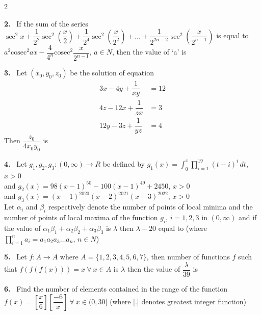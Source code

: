 \documentclass[10pt]{extarticle}
\newcommand{\qn}[1]{\par\smallskip\noindent\textbf{#1.}~}
\begin{document}
\begin{multicols}{2}
\qn{2} If the sum of the series $\sec^2x+\dfrac{1}{2^2}\sec^2\left(\dfrac x2\right)+\dfrac{1}{2^4}\sec^2\left(\dfrac{x}{2^2}\right)+\dots+\dfrac{1}{2^{2n-2}}\sec^2\left(\dfrac{x}{2^{n-1}}\right)$ is equal to $a^2\mathrm{cosec}^2ax-\dfrac{4}{4^n}\mathrm{cosec}^2\dfrac{x}{2^{n-1}}$, $a\in N$, then the value of `a' is

\qn{3} Let $(x_0,y_0,z_0)$ be the solution of equation
\begin{align*}
3x-4y+\dfrac{1}{xy}&=12\\
4z-12x+\dfrac{1}{zx}&=3\\
12y-3z+\dfrac{1}{yz}&=4
\end{align*}
Then $\dfrac{z_0}{4x_0y_0}$ is

\qn{4} Let $g_1,g_2,g_3:(0,\infty)\to R$ be defined by $g_1(x)=\displaystyle\int_0^x\prod_{i=1}^{19}(t-i)^i\,dt$, $x>0$\\
and $g_2(x)=98(x-1)^{50}-100(x-1)^{49}+2450$, $x>0$\\
and $g_3(x)=(x-1)^{2020}(x-2)^{2021}(x-3)^{2022}$, $x>0$\\
Let $\alpha_i$ and $\beta_i$ respectively denote the number of points of local minima and the number of points of local maxima of the function $g_i$, $i=1,2,3$ in $(0,\infty)$ and if the value of $\alpha_1\beta_1+\alpha_2\beta_2+\alpha_3\beta_3$ is $\lambda$ then $\lambda-20$ equal to (where $\displaystyle\prod_{i=1}^{n}a_i=a_1a_2a_3\dots a_n$, $n\in N$)

\qn{5} Let $f:A\to A$ where $A=\{1,2,3,4,5,6,7\}$, then number of functions $f$ such that $f(f(f(x)))=x\ \forall\ x\in A$ is $\lambda$ then the value of $\dfrac{\lambda}{39}$ is

\qn{6} Find the number of elements contained in the range of the function $f(x)=\left[\dfrac x6\right]\left[\dfrac{-6}{x}\right]\ \forall\ x\in(0,30]$ (where [.] denotes greatest integer function)

\end{multicols}
\end{document}
